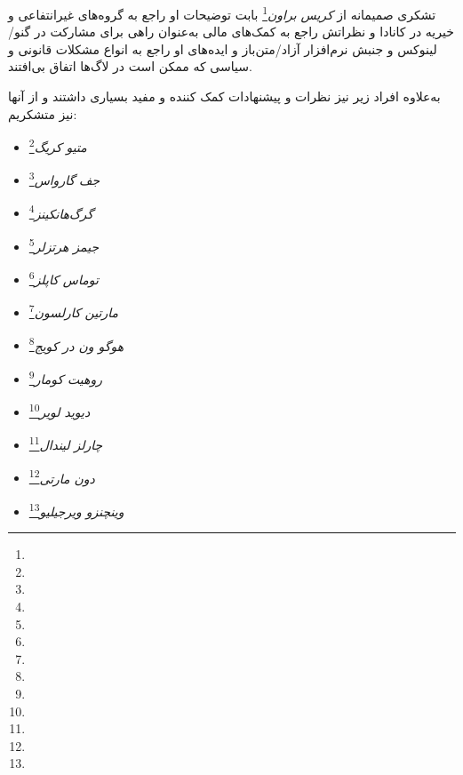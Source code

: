 تشکری صمیمانه از
\emph{کریس براون}\footnote{}
بابت توضیحات او راجع به گروه‌های غیرانتفاعی و خیریه در کانادا و نظراتش راجع به کمک‌های مالی به‌عنوان
راهی برای مشارکت در گنو/لینوکس و جنبش نرم‌افزار آزاد/متن‌باز و ایده‌های او راجع به انواع مشکلات قانونی
و سیاسی که ممکن است در لاگ‌ها اتفاق بی‌افتند.

به‌علاوه افراد زیر نیز نظرات و پیشنهادات کمک کننده و مفید بسیاری داشتند و از آنها نیز متشکریم:

\begin{itemize}
\item \emph{متیو کریگ}\footnote{}
\item \emph{جف گارواس}\footnote{}
\item \emph{گرگ‌هانکینز}\footnote{}
\item \emph{جیمز هرتزلر}\footnote{}
\item \emph{توماس کاپلز}\footnote{}
\item \emph{مارتین کارلسون}\footnote{}
\item \emph{هوگو ون در کویج}\footnote{}
\item \emph{روهیت کومار}\footnote{}
\item \emph{دیوید لویر}\footnote{}
\item \emph{چارلز لیندال}\footnote{}
\item \emph{دون مارتی}\footnote{}
\item \emph{وینچنزو ویرجیلیو}\footnote{}
\end{itemize}

